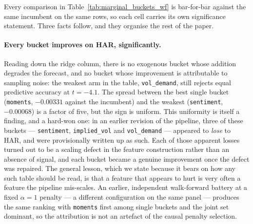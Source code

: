 Every comparison in Table~\ref{tab:marginal_buckets_wf} is bar-for-bar against the same
incumbent on the same rows, so each cell carries its own significance statement. Three
facts follow, and they organise the rest of the paper.

\paragraph{Every bucket improves on HAR, significantly.} Reading down the ridge column,
there is no exogenous bucket whose addition degrades the forecast, and no bucket whose
improvement is attributable to sampling noise: the weakest arm in the table,
\texttt{vol\_demand}, still rejects equal predictive accuracy at $t = -4.1$. The spread
between the best single bucket (\texttt{moments}, $-0.00331$ against the incumbent) and
the weakest (\texttt{sentiment}, $-0.00068$) is a factor of five, but the sign is
uniform. This uniformity is itself a finding, and a hard-won one: in an earlier revision
of the pipeline, three of these buckets --- \texttt{sentiment}, \texttt{implied\_vol} and
\texttt{vol\_demand} --- appeared to \emph{lose} to HAR, and were provisionally written up
as such. Each of those apparent losses turned out to be a scaling defect in the feature
construction rather than an absence of signal, and each bucket became a genuine
improvement once the defect was repaired. The general lesson, which we state because it
bears on how any such table should be read, is that a feature that appears to hurt is
very often a feature the pipeline mis-scales. An earlier, independent walk-forward
battery at a fixed $\alpha = 1$ penalty --- a different configuration on the same panel
--- produces the same ranking with \texttt{moments} first among single buckets and the
joint set dominant, so the attribution is not an artefact of the causal penalty
selection.


